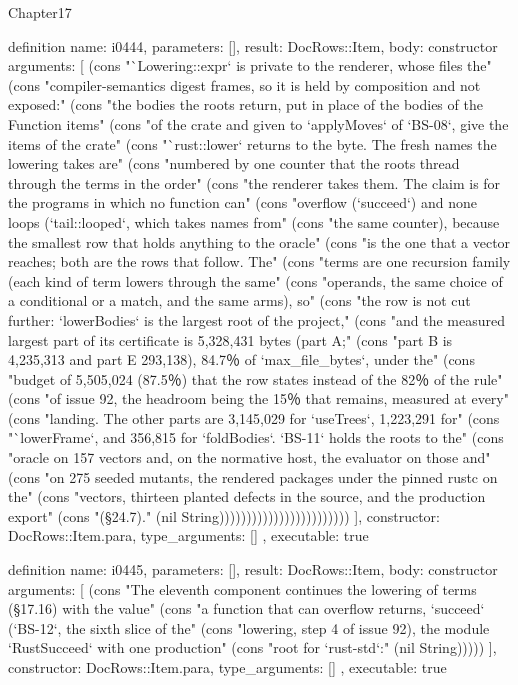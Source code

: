 \begin{lexlean}{Chapter17}
\begin{semanticmodule}
definition{
  name: i0444,
  parameters: [],
  result: DocRows::Item,
  body: constructor{
    arguments: [
      (cons "`Lowering::expr` is private to the renderer, whose files the" (cons "compiler-semantics digest frames, so it is held by composition and not exposed:" (cons "the bodies the roots return, put in place of the bodies of the Function items" (cons "of the crate and given to `applyMoves` of `BS-08`, give the items of the crate" (cons "`rust::lower` returns to the byte. The fresh names the lowering takes are" (cons "numbered by one counter that the roots thread through the terms in the order" (cons "the renderer takes them. The claim is for the programs in which no function can" (cons "overflow (`succeed`) and none loops (`tail::looped`, which takes names from" (cons "the same counter), because the smallest row that holds anything to the oracle" (cons "is the one that a vector reaches; both are the rows that follow. The" (cons "terms are one recursion family (each kind of term lowers through the same" (cons "operands, the same choice of a conditional or a match, and the same arms), so" (cons "the row is not cut further: `lowerBodies` is the largest root of the project," (cons "and the measured largest part of its certificate is 5,328,431 bytes (part A;" (cons "part B is 4,235,313 and part E 293,138), 84.7％ of `max_file_bytes`, under the" (cons "budget of 5,505,024 (87.5％) that the row states instead of the 82％ of the rule" (cons "of issue 92, the headroom being the 15％ that remains, measured at every" (cons "landing. The other parts are 3,145,029 for `useTrees`, 1,223,291 for" (cons "`lowerFrame`, and 356,815 for `foldBodies`. `BS-11` holds the roots to the" (cons "oracle on 157 vectors and, on the normative host, the evaluator on those and" (cons "on 275 seeded mutants, the rendered packages under the pinned rustc on the" (cons "vectors, thirteen planted defects in the source, and the production export" (cons "(§24.7)." (nil String))))))))))))))))))))))))
    ],
    constructor: DocRows::Item.para,
    type_arguments: []
  },
  executable: true
}

definition{
  name: i0445,
  parameters: [],
  result: DocRows::Item,
  body: constructor{
    arguments: [
      (cons "The eleventh component continues the lowering of terms (§17.16) with the value" (cons "a function that can overflow returns, `succeed` (`BS-12`, the sixth slice of the" (cons "lowering, step 4 of issue 92), the module `RustSucceed` with one production" (cons "root for `rust-std`:" (nil String)))))
    ],
    constructor: DocRows::Item.para,
    type_arguments: []
  },
  executable: true
}


\end{semanticmodule}
\end{lexlean}
